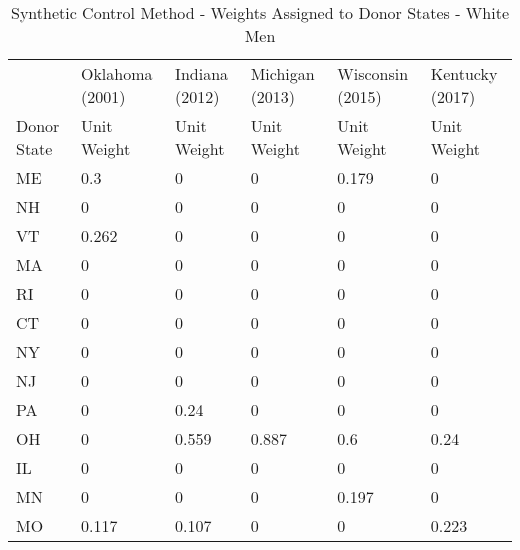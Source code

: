 \begin{table}[ht!]\centering
\caption{Synthetic Control Method - Weights Assigned to Donor States - White Men}\label{tab:donor_weights_wm}
\fontsize{10}{11}\selectfont
\begin{tabular}{llllll}
            &                 &                &                 &                  &                 \\
            \hline
            \hline
            & Oklahoma (2001) & Indiana (2012) & Michigan (2013) & Wisconsin (2015) & Kentucky (2017) \\
            \hline
Donor State & Unit Weight     & Unit Weight    & Unit Weight     & Unit Weight      & Unit Weight     \\
            \hline
ME          & 0.3             & 0              & 0               & 0.179            & 0               \\
NH          & 0               & 0              & 0               & 0                & 0               \\
VT          & 0.262           & 0              & 0               & 0                & 0               \\
MA          & 0               & 0              & 0               & 0                & 0               \\
RI          & 0               & 0              & 0               & 0                & 0               \\
CT          & 0               & 0              & 0               & 0                & 0               \\
NY          & 0               & 0              & 0               & 0                & 0               \\
NJ          & 0               & 0              & 0               & 0                & 0               \\
PA          & 0               & 0.24           & 0               & 0                & 0               \\
OH          & 0               & 0.559          & 0.887           & 0.6              & 0.24            \\
IL          & 0               & 0              & 0               & 0                & 0               \\
MN          & 0               & 0              & 0               & 0.197            & 0               \\
MO          & 0.117           & 0.107          & 0               & 0                & 0.223           \\

\end{tabular}
\end{table}
